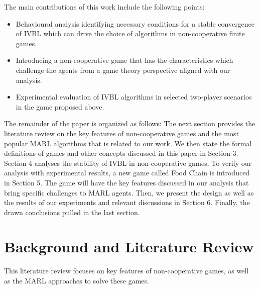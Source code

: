 \documentclass[]{interact}
\theoremstyle{plain}%
\theoremstyle{definition}
\theoremstyle{remark}
\begin{document}
The main contributions of this work include the following points:
\begin{itemize}
    \item Behavioural analysis identifying necessary conditions for a stable convergence of IVBL which can drive the choice of algorithms in non-cooperative finite games.
    \item Introducing a non-cooperative game that has the characteristics which challenge the agents from a game theory perspective aligned with our analysis.
    \item Experimental evaluation of IVBL algorithms in selected two-player scenarios in the game proposed above.
\end{itemize}

The remainder of the paper is organized as follows:
The next section provides the literature review on the key features of non-cooperative games and the most popular MARL algorithms that is related to our work. We then state the formal definitions of games and other concepts discussed in this paper in Section 3. Section 4 analyses the stability of IVBL in non-cooperative games. To verify our analysis with experimental results, a new game called Food Chain is introduced in Section 5. The game will have the key features discussed in our analysis that bring specific challenges to MARL agents. Then, we present the design as well as the results of our experiments and relevant discussions in Section 6. Finally, the drawn conclusions pulled in the last section.

\section{Background and Literature Review}
This literature review focuses on key features of non-cooperative games, as well as the MARL approaches to solve these games.
\end{document}
